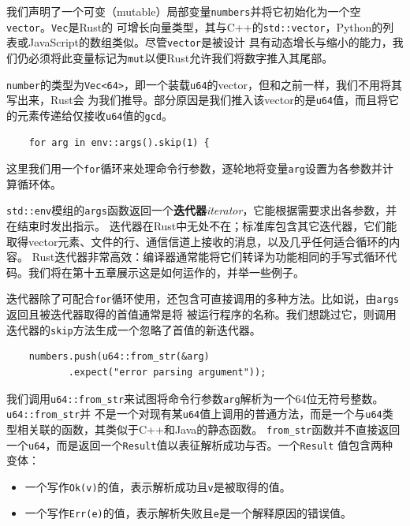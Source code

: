 \smallskip
我们声明了一个可变（mutable）局部变量\texttt{numbers}并将它初始化为一个空\texttt{vector}。\texttt{Vec}是Rust的
可增长向量类型，其与C++的\texttt{std::vector}，Python的列表或JavaScript的数组类似。尽管\texttt{vector}是被设计
具有动态增长与缩小的能力，我们仍必须将此变量标记为\texttt{mut}以便Rust允许我们将数字推入其尾部。

\medskip
\texttt{number}的类型为\texttt{Vec<64>}，即一个装载\texttt{u64}的vector，但和之前一样，我们不用将其写出来，Rust会
为我们推导。部分原因是我们推入该vector的是\texttt{u64}值，而且将它的元素传递给仅接收\texttt{u64}值的\texttt{gcd}。
\begin{verbatim}
    for arg in env::args().skip(1) {
\end{verbatim}

\smallskip
这里我们用一个\texttt{for}循环来处理命令行参数，逐轮地将变量\texttt{arg}设置为各参数并计算循环体。

\medskip
\texttt{std::env}模组的\texttt{args}函数返回一个\textbf{迭代器}\textit{iterator}，它能根据需要求出各参数，并在结束时发出指示。
迭代器在Rust中无处不在；标准库包含其它迭代器，它们能取得vector元素、文件的行、通信信道上接收的消息，以及几乎任何适合循环的内容。
Rust迭代器非常高效：编译器通常能将它们转译为功能相同的手写式循环代码。我们将在第十五章展示这是如何运作的，并举一些例子。

\medskip
迭代器除了可配合\texttt{for}循环使用，还包含可直接调用的多种方法。比如说，由\texttt{args}返回且被迭代器取得的首值通常是将
被运行程序的名称。我们想跳过它，则调用迭代器的\texttt{skip}方法生成一个忽略了首值的新迭代器。
\begin{verbatim}
    numbers.push(u64::from_str(&arg)
           .expect("error parsing argument"));
\end{verbatim}

\smallskip
我们调用\texttt{u64::from\_str}来试图将命令行参数\texttt{arg}解析为一个64位无符号整数。\texttt{u64::from\_str}并
不是一个对现有某\texttt{u64}值上调用的普通方法，而是一个与\texttt{u64}类型相关联的函数，其类似于C++和Java的静态函数。
\texttt{from\_str}函数并不直接返回一个\texttt{u64}，而是返回一个\texttt{Result}值以表征解析成功与否。一个\texttt{Result}
值包含两种变体：
\begin{itemize}
    \item 一个写作\texttt{Ok(v)}的值，表示解析成功且\texttt{v}是被取得的值。
    \item 一个写作\texttt{Err(e)}的值，表示解析失败且\texttt{e}是一个解释原因的错误值。
\end{itemize}

